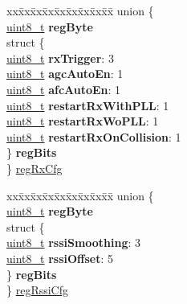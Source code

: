 \begin{DoxyCompactItemize}
\begin{tabbing}
\end{tabbing}\item 
\begin{tabbing}
xx\=xx\=xx\=xx\=xx\=xx\=xx\=xx\=xx\=\kill
union \{\\
\>\hyperlink{vl53l0x__types_8h_aba7bc1797add20fe3efdf37ced1182c5}{uint8\_t} {\bfseries regByte}\\
\>struct \{\\
\>\>\hyperlink{vl53l0x__types_8h_aba7bc1797add20fe3efdf37ced1182c5}{uint8\_t} {\bfseries rxTrigger}: 3\\
\>\>\hyperlink{vl53l0x__types_8h_aba7bc1797add20fe3efdf37ced1182c5}{uint8\_t} {\bfseries agcAutoEn}: 1\\
\>\>\hyperlink{vl53l0x__types_8h_aba7bc1797add20fe3efdf37ced1182c5}{uint8\_t} {\bfseries afcAutoEn}: 1\\
\>\>\hyperlink{vl53l0x__types_8h_aba7bc1797add20fe3efdf37ced1182c5}{uint8\_t} {\bfseries restartRxWithPLL}: 1\\
\>\>\hyperlink{vl53l0x__types_8h_aba7bc1797add20fe3efdf37ced1182c5}{uint8\_t} {\bfseries restartRxWoPLL}: 1\\
\>\>\hyperlink{vl53l0x__types_8h_aba7bc1797add20fe3efdf37ced1182c5}{uint8\_t} {\bfseries restartRxOnCollision}: 1\\
\>\} {\bfseries regBits}\\
\} \hyperlink{structFSK__Register__Map_a0ed113da5f9c47e4f68ab98fefd48a1f}{regRxCfg}\\

\end{tabbing}\item 
\begin{tabbing}
xx\=xx\=xx\=xx\=xx\=xx\=xx\=xx\=xx\=\kill
union \{\\
\>\hyperlink{vl53l0x__types_8h_aba7bc1797add20fe3efdf37ced1182c5}{uint8\_t} {\bfseries regByte}\\
\>struct \{\\
\>\>\hyperlink{vl53l0x__types_8h_aba7bc1797add20fe3efdf37ced1182c5}{uint8\_t} {\bfseries rssiSmoothing}: 3\\
\>\>\hyperlink{vl53l0x__types_8h_aba7bc1797add20fe3efdf37ced1182c5}{uint8\_t} {\bfseries rssiOffset}: 5\\
\>\} {\bfseries regBits}\\
\} \hyperlink{structFSK__Register__Map_a79e4cf8525de96668c8d329c92fc587e}{regRssiCfg}\\


\end{tabbing}
\end{DoxyCompactItemize}

